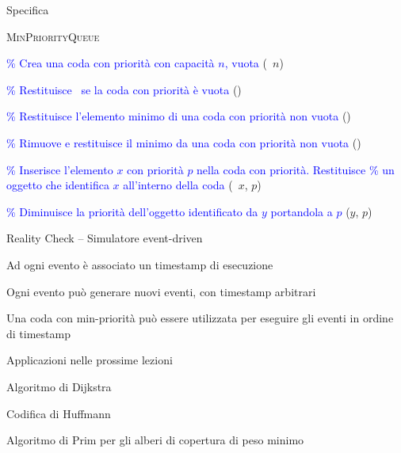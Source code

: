 \begin{frame}[shrink=8]{Specifica}

\vspace{-12pt}
\begin{Procedure}
\caption[A]{\textsc{MinPriorityQueue}}

\BlankLine
\textcolor{blue}{\% Crea una coda con priorità con capacità $n$, vuota}\;
\Heap \heapconstructor(\INTEGER\ $n$)\;

\BlankLine
\textcolor{blue}{\% Restituisce \TRUE\ se la coda con priorità è vuota}\;
\BOOLEAN \setempty()\; 

\BlankLine
\textcolor{blue}{\% Restituisce l'elemento minimo di una coda con priorità non vuota}\;
\Item \heapmin()\;

\BlankLine
\textcolor{blue}{\% Rimuove e restituisce il minimo da una coda con priorità non vuota}\;
\Item \heapdeletemin()\;
 
\BlankLine
\textcolor{blue}{\% Inserisce l'elemento $x$ con priorità $p$ nella coda con priorità. Restituisce}\;
\textcolor{blue}{\% un oggetto \PriorityItem che identifica $x$ all'interno della coda}\;
\PriorityItem \heapinsert(\Item\ $x$, \INTEGER $p$)\;

\BlankLine
\textcolor{blue}{\% Diminuisce la priorità dell'oggetto identificato da $y$ portandola a $p$}\;
\heapdecrease(\PriorityItem $y$, \INTEGER $p$)\;

\BlankLine
\end{Procedure}

\end{frame}

\begin{frame}{Reality Check -- Simulatore event-driven}

\vspace{-9pt}
\BIL
\item Ad ogni evento è associato un timestamp di esecuzione
\item Ogni evento può generare nuovi eventi, con timestamp arbitrari
\item Una coda con min-priorità può essere utilizzata per eseguire gli eventi in ordine di timestamp
\EIL

\medskip
{}



\end{frame}

\begin{frame}{Applicazioni nelle prossime lezioni}
\BIL
\item Algoritmo di Dijkstra
\item Codifica di Huffmann
\item Algoritmo di Prim per gli alberi di copertura di peso minimo
\EIL
\end{frame}



